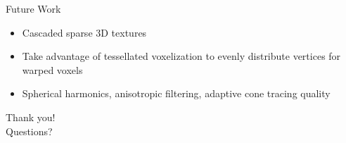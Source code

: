 \documentclass[10pt]{beamer}
\begin{document}
\begin{frame}{Future Work}


  \begin{itemize}
    \item Cascaded sparse 3D textures %
    \item Take advantage of tessellated voxelization to evenly distribute vertices for warped voxels %
    \item Spherical harmonics, anisotropic filtering, adaptive cone tracing quality %
  \end{itemize}
\end{frame}

\begin{frame}[standout]
  \LARGE Thank you!\\
  \vspace{1cm}
  \LARGE Questions?
\end{frame}

\end{document}
